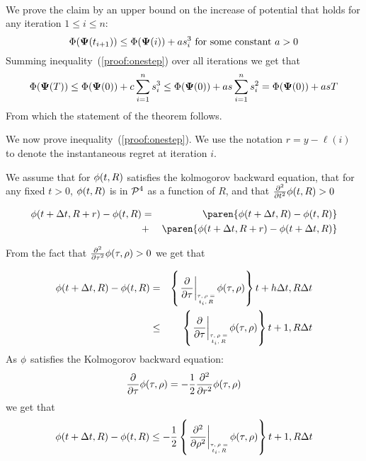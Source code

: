 \documentclass{article}[12pt]
\begin{document}
\\
We prove the claim by an upper bound on the increase of potential that holds for any iteration $1 \leq i \leq n$:
\begin{equation} \label{proof:onestep}
\Phi({\bf \Psi}(t_{i+1})) \leq \Phi({\bf \Psi}(i)) + a s_i^3 \mbox{ for some constant } a>0
\end{equation}
Summing inequality~(\ref{proof:onestep}) over all iterations we get that 
\begin{equation} \label{proof:allsteps}
\Phi({\bf \Psi}(T)) \leq \Phi({\bf \Psi}(0)) + c \sum_{i=1}^n s_i^3 \leq 
\Phi({\bf \Psi}(0)) + a s \sum_{i=1}^n s_i^2 = 
\Phi({\bf \Psi}(0)) + a s T
\end{equation}
From which the statement of the theorem follows.

We now prove inequality~(\ref{proof:onestep}). 
We use the notation $r=y -\ell(i)$ to denote the instantaneous regret at iteration $i$. 
\fi



We assume that for $\phi(t,R)$ satisfies the kolmogorov backward equation,
that for any fixed $t>0$, $\phi(t,R)$ is in ${\cal P}^{4}$ as a function of $R$, and that
$\frac{\partial^2}{\partial t^2} \phi(t,R) > 0$


\begin{eqnarray} 
  \pot(t+\deltat,\R+r) - \pot(t,\R)
  &=& \paren{\pot(t+\deltat,\R) - \pot(t,\R)} \nonumber\\
  &+& \paren{\pot(t+\deltat,\R+r)-\pot(t+\deltat,\R)} \label{eqn:diffs}
\end{eqnarray}

From the fact that $\frac{\partial^2}{\partial \tau^2} \phi(\tau,\rho) > 0$ we get that 

\begin{eqnarray}
\pot(t+\deltat,\R) - \pot(t,\R) &=& \at{\frac{\partial}{\partial \tau}}{t+h\deltat,R}  \deltat \nonumber \\
  & \leq & \at{\frac{\partial}{\partial \tau}}{t+1,R}  \deltat \label{eqn:interior-point-dt}
\end{eqnarray}
As $\phi$ satisfies the Kolmogorov backward equation:
\begin{equation*} 
  \frac{\partial}{\partial \tau} \phi(\tau,\rho)
  = -\frac{1}{2} \frac{\partial^2}{\partial r^2} \phi(\tau,\rho)
\end{equation*}
we get that
\begin{equation}
  \pot(t+\deltat,\R) - \pot(t,\R) \leq
  -\frac{1}{2} \at{\frac{\partial^2}{\partial \rho^2}}{t+1,R} \deltat
  \label{eqn:usingKol}
\end{equation}
\end{document}
